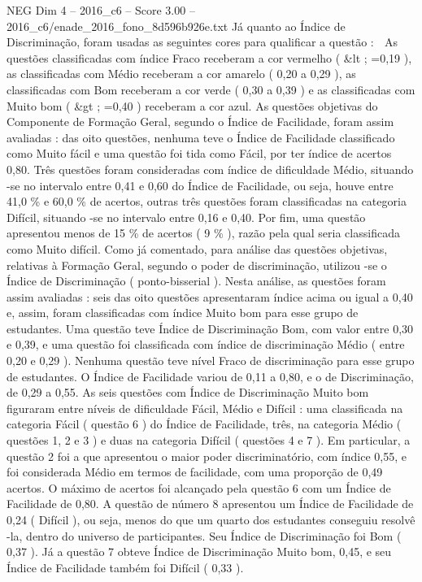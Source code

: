 \begin{textsample}{NEG Dim 4 – 2016\_c6 – Score 3.00 – 2016\_c6/enade\_2016\_fono\_8d596b926e.txt}
Já quanto ao Índice de Discriminação, foram usadas as seguintes cores para qualificar a questão :  As questões classificadas com índice Fraco receberam a cor vermelho ( \&lt ; =0,19 ), as classificadas com Médio receberam a cor amarelo ( 0,20 a 0,29 ), as classificadas com Bom receberam a cor verde ( 0,30 a 0,39 ) e as classificadas com Muito bom ( \&gt ; =0,40 ) receberam a cor azul.
As questões objetivas do Componente de Formação Geral, segundo o Índice de Facilidade, foram assim avaliadas : das oito questões, nenhuma teve o Índice de Facilidade classificado como Muito fácil e uma questão foi tida como Fácil, por ter índice de acertos 0,80.
Três questões foram consideradas com índice de dificuldade Médio, situando -se no intervalo entre 0,41 e 0,60 do Índice de Facilidade, ou seja, houve entre 41,0 \% e 60,0 \% de acertos, outras três questões foram classificadas na categoria Difícil, situando -se no intervalo entre 0,16 e 0,40.
Por fim, uma questão apresentou menos de 15 \% de acertos ( 9 \% ), razão pela qual seria classificada como Muito difícil.
Como já comentado, para análise das questões objetivas, relativas à Formação Geral, segundo o poder de discriminação, utilizou -se o Índice de Discriminação ( ponto-bisserial ).
Nesta análise, as questões foram assim avaliadas : seis das oito questões apresentaram índice acima ou igual a 0,40 e, assim, foram classificadas com índice Muito bom para esse grupo de estudantes.
Uma questão teve Índice de Discriminação Bom, com valor entre 0,30 e 0,39, e uma questão foi classificada com índice de discriminação Médio ( entre 0,20 e 0,29 ).
Nenhuma questão teve nível Fraco de discriminação para esse grupo de estudantes.
O Índice de Facilidade variou de 0,11 a 0,80, e o de Discriminação, de 0,29 a 0,55.
As seis questões com Índice de Discriminação Muito bom figuraram entre níveis de dificuldade Fácil, Médio e Difícil : uma classificada na categoria Fácil ( questão 6 ) do Índice de Facilidade, três, na categoria Médio ( questões 1, 2 e 3 ) e duas na categoria Difícil ( questões 4 e 7 ).
Em particular, a questão 2 foi a que apresentou o maior poder discriminatório, com índice 0,55, e foi considerada Médio em termos de facilidade, com uma proporção de 0,49 acertos.
O máximo de acertos foi alcançado pela questão 6 com um Índice de Facilidade de 0,80.
A questão de número 8 apresentou um Índice de Facilidade de 0,24 ( Difícil ), ou seja, menos do que um quarto dos estudantes conseguiu resolvê -la, dentro do universo de participantes.
Seu Índice de Discriminação foi Bom ( 0,37 ).
Já a questão 7 obteve Índice de Discriminação Muito bom, 0,45, e seu Índice de Facilidade também foi Difícil ( 0,33 ).

\end{textsample}
